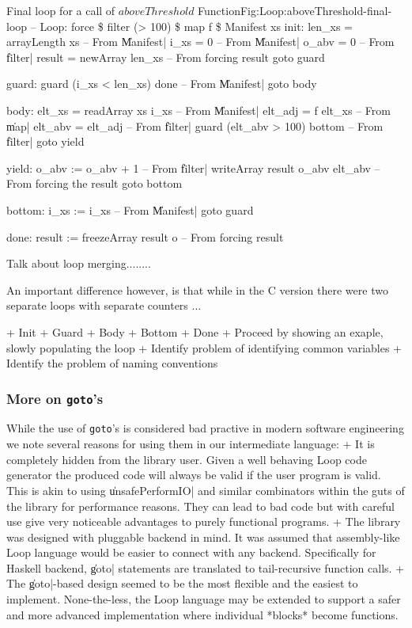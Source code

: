 \documentclass[preamble.tex]{subfiles}
\begin{document}
\begin{loopcode2}{Final loop for a call of $aboveThreshold$ Function}{Fig:Loop:aboveThreshold-final-loop}
  -- Loop: force \$ filter (> 100) \$ map f \$ Manifest xs
  init:
    len_xs = arrayLength xs          -- From \|Manifest|
    i_xs = 0                         -- From \|Manifest|
    o_abv = 0                        -- From \|filter|
    result = newArray len_xs         -- From forcing result
    goto guard

  guard:
    guard (i_xs < len_xs) done       -- From \|Manifest|
    goto body

  body:
    elt_xs = readArray xs i_xs       -- From \|Manifest|
    elt_adj = f elt_xs               -- From \|map|
    elt_abv = elt_adj                -- From \|filter|     
    guard (elt_abv > 100) bottom     -- From \|filter|
    goto yield

  yield:
    o_abv := o_abv + 1               -- From \|filter|
    writeArray result o_abv elt_abv  -- From forcing the result
    goto bottom

  bottom:
    i_xs := i_xs                     -- From \|Manifest|
    goto guard

  done:
    result := freezeArray result o   -- From forcing result

\end{loopcode2}

Talk about loop merging........

An important difference however, is that while in the C version there were two separate loops with separate counters ...



+ Init
+ Guard
+ Body
+ Bottom
+ Done
+ Proceed by showing an exaple, slowly populating the loop
+ Identify problem of identifying common variables
+ Identify the problem of naming conventions

\subsubsection{More on \texttt{goto}'s}

While the use of \texttt{goto}'s is considered bad practive in modern software engineering we note several reasons for using them in our intermediate language:
+ It is completely hidden from the library user. Given a well behaving Loop code generator the produced code will always be valid if the user program is valid. This is akin to using \|unsafePerformIO| and similar combinators within the guts of the library for performance reasons. They can lead to bad code but with careful use give very noticeable advantages to purely functional programs.
+ The library was designed with pluggable backend in mind. It was assumed that assembly-like Loop language would be easier to connect with any backend. Specifically for Haskell backend, \|goto| statements are translated to tail-recursive function calls.
+ The \|goto|-based design seemed to be the most flexible and the easiest to implement. None-the-less, the Loop language may be extended to support a safer and more advanced implementation where individual *blocks* become functions.
\end{document}
